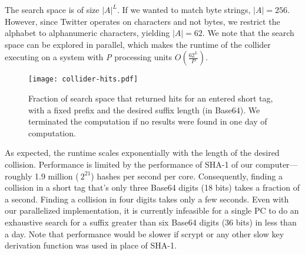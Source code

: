 The search space is of size $|A|^L$. If we wanted to match byte strings,
$|A| = 256$. However, since Twitter operates on characters and not
bytes, we restrict the alphabet to alphanumeric characters, yielding
$|A| = 62$. We note that the search space can be explored in parallel,
which makes the runtime of the collider executing on a system with
\textit{P} processing units $O(\frac{62^L}{P})$.

\begin{figure}
\begin{center}
\texttt{[image: collider-hits.pdf]}
\caption{Fraction of search space that returned hits for an entered short
  tag, with a fixed prefix and the desired suffix length (in
  Base64). We terminated the computation if no results were found in
  one day of computation.\label{fig:collider-hits}}
\end{center}
\end{figure}
\fi

As expected, the runtime scales exponentially with the length of the
desired collision.  Performance is limited by the performance of SHA-1
of our computer--- roughly 1.9 million ($~2^{21}$) hashes per second per
core.
Consequently, finding a collision in a short tag that's only three
Base64 digits (18 bits) takes a fraction of a second. Finding a
collision in four digits takes only a few seconds. Even with our
parallelized implementation, it is currently infeasible for a single PC
to do an exhaustive search for a suffix greater than six Base64 digits
(36 bits) in less than a day. Note that performance would be slower if
scrypt or any other slow key derivation function was used in place of
SHA-1.


